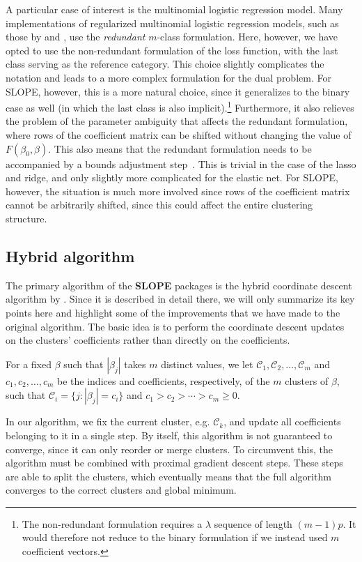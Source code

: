\documentclass[a4paper,fleqn]{cas-sc}
\begin{document}
A particular case of interest is the multinomial logistic regression model. Many
implementations of regularized multinomial logistic regression models, such as
those by \citet{friedman2010} and \citet{fercoq2015}, use the \emph{redundant}
\(m\)-class formulation. Here, however, we have opted to use the non-redundant
formulation of the loss function, with the last class serving as the reference
category. This choice slightly complicates the notation and leads to a more
complex formulation for the dual problem. For SLOPE, however, this is a more
natural choice, since it generalizes to the binary case as well (in which the
last class is also implicit).\footnote{The non-redundant formulation requires a
\(\lambda\) sequence of length \((m - 1)p\). It would therefore not reduce to
the binary formulation if we instead used \(m\) coefficient vectors.}
Furthermore, it also relieves the problem of the parameter ambiguity that
affects the redundant formulation, where rows of the coefficient matrix can be
shifted without changing the value of \(F(\beta_0, \beta)\). This also means
that the redundant formulation needs to be accompanied by a bounds adjustment
step~\citep{friedman2010}. This is trivial in the case of the lasso and ridge,
and only slightly more complicated for the elastic net. For SLOPE, however, the
situation is much more involved since rows of the coefficient matrix cannot be
arbitrarily shifted, since this could affect the entire clustering structure.

\subsection{Hybrid algorithm}

The primary algorithm of the \textbf{SLOPE} packages is the hybrid coordinate
descent algorithm by \citet{larsson2023}. Since it is described in detail there,
we will only summarize its key points here and highlight some of the
improvements that we have made to the original algorithm. The basic idea is to
perform the coordinate descent updates on the clusters' coefficients rather than
directly on the coefficients.

For a fixed $\beta$ such that $|\beta_j|$ takes $m$ distinct values, we let
\(\mathcal{C}_1, \mathcal{C}_2 , \dots, \mathcal{C}_m\) and
\(c_1, c_2, \dots, c_m\) be the indices and coefficients, respectively, of the
\(m\) clusters of $\beta$, such that $\mathcal{C}_i = \{j : |\beta_j| = c_i\}$
and $c_1 > c_2 > \cdots > c_m \geq 0.$

In our algorithm, we fix the current cluster, e.g. $\mathcal{C}_k$, and update
all coefficients belonging to it in a single step. By itself, this algorithm is
not guaranteed to converge, since it can only reorder or merge clusters. To
circumvent this, the algorithm must be combined with proximal gradient descent
steps. These steps are able to split the clusters, which eventually means that
the full algorithm converges to the correct clusters and global minimum.
\end{document}
